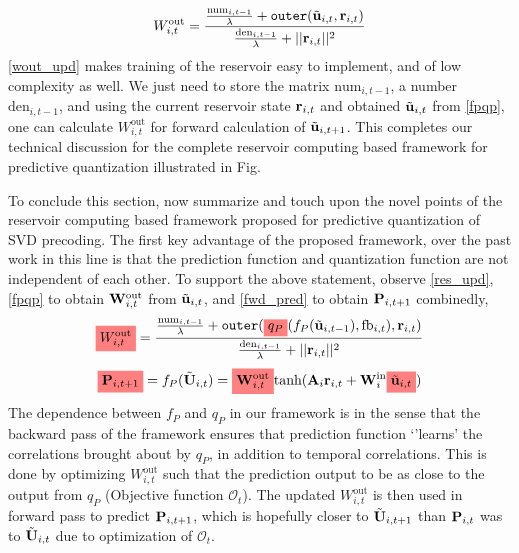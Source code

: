 \documentclass[conference]{IEEEtran}
\newcommand{\highlight}[1]{%
  \colorbox{red!50}{$\displaystyle#1$}}
\begin{document}
\begin{equation}
W_{i,t}^{\text{out}}=\frac{\frac{\text{num}_{i,t-1}}{\lambda}+\texttt{outer}(\tilde{\bu}_{i,t},\br_{i,t})}{\frac{\text{den}_{i,t-1}}{\lambda}+||\br_{i,t}||^2}
\label{wout_upd}
\end{equation}
\eqref{wout_upd} makes training of the reservoir easy to implement, and of low complexity as well. 
We just need to store the matrix $\text{num}_{i,t-1}$, a number $\text{den}_{i,t-1}$, and using the current reservoir state ${\bf r}_{i,t}$ and obtained $\tilde{{\bf u}}_{i,t}$ from \eqref{fpqp}, one can calculate $W_{i,t}^{\text{out}}$ for forward calculation of $\tilde{{\bf u}}_{i,t+1}$. 
This completes our technical discussion for the complete reservoir computing based framework for predictive quantization illustrated in Fig. %

To conclude this section, now summarize and touch upon the novel points of the reservoir computing based framework proposed for predictive quantization of SVD precoding. 
The first key advantage of the proposed framework, over the past work in this line \cite{Gupt1905:Predictive,6891198,6545375} is that the prediction function and quantization function are not independent of each other.
To support the above statement, observe \eqref{res_upd},\eqref{fpqp} to obtain ${\bf W}^{\text{out}}_{i,t}$ from $\tilde{{\bf u}}_{i,t}$, and \eqref{fwd_pred} to obtain ${\bf P}_{i,t+1}$ combinedly,
\begin{equation*}
\highlight{W_{i,t}^{\text{out}}}=\frac{\frac{\text{num}_{i,t-1}}{\lambda}+\texttt{outer}(\highlight{q_P}(f_P(\tilde{\bu}_{i,t-1}),\text{fb}_{i,t}),\br_{i,t})}{\frac{\text{den}_{i,t-1}}{\lambda}+||\br_{i,t}||^2}
\end{equation*}
\begin{equation*}
\highlight{\bP_{i,t+1}}=f_P(\tilde{\bU}_{i,t})=\highlight{\bW^{\text{out}}_{i,t}}\text{tanh}(\bA_i\br_{i,t}+\bW^{\text{in}}_i\highlight{\tilde{\bu}_{i,t}})
\end{equation*}
The dependence between $f_P$ and $q_P$ in our framework is in the sense that the backward pass of the framework ensures that prediction function `'learns' the correlations brought about by $q_P$, in addition to temporal correlations. %
This is done by optimizing $W_{i,t}^{\text{out}}$ such that the prediction output to be as close to the output from $q_P$ (Objective function $\mathcal{O}_t$).
The updated $W_{i,t}^{\text{out}}$ is then used in forward pass to predict ${\bf P}_{i,t+1}$, which is hopefully closer to $\tilde{{\bf U}}_{i,t+1}$ than ${\bf P}_{i,t}$ was to $\tilde{{\bf U}}_{i,t}$ due to optimization of $\mathcal{O}_t$.
\end{document}
